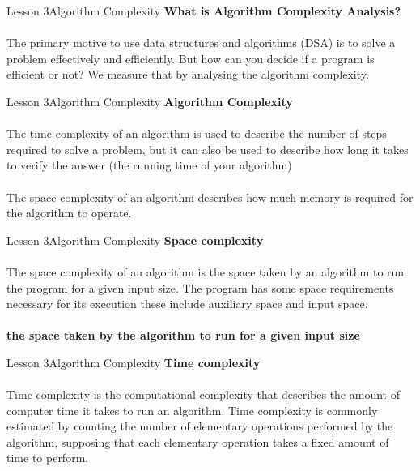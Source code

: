 \documentclass[aspectratio=1610]{beamer}
\begin{document}
\begin{frame}{Lesson 3}{Algorithm Complexity}
\LARGE
\textbf{What is Algorithm Complexity Analysis?}\\~\\
\Large
The primary motive to use data structures and algorithms (DSA) is to 
\alert{solve} a problem effectively and efficiently. But how can you decide 
if a program is efficient or not? We measure that by analysing the algorithm
complexity.
\end{frame}



\begin{frame}{Lesson 3}{Algorithm Complexity}
\LARGE
\textbf{Algorithm Complexity}\\~\\
\Large
The \alert{time complexity} of an algorithm is used to describe the 
number of steps required to solve a problem, but it can also be used
to describe how long it takes to verify the answer (the running time
of your algorithm)\\~\\
The \alert{space complexity} of an algorithm describes how much memory is
required for the algorithm to operate. 
\end{frame}



\begin{frame}{Lesson 3}{Algorithm Complexity}
\LARGE
\textbf{Space complexity}\\~\\
The space complexity of an algorithm is the space taken by an algorithm 
to run the program for a given input size. The program has some space 
requirements necessary for its execution these include auxiliary space 
and input space.\\~\\
\Large
\textbf{the space taken by the algorithm to run for a given input size}
\end{frame}




\begin{frame}{Lesson 3}{Algorithm Complexity}
\LARGE
\textbf{Time complexity}\\~\\
Time complexity is the computational complexity that describes the
amount of computer time it takes to run an algorithm. Time
complexity is commonly estimated by counting the number of
elementary operations performed by the algorithm, supposing that
each elementary operation takes a fixed amount of time to perform.
\end{frame}
\end{document}
